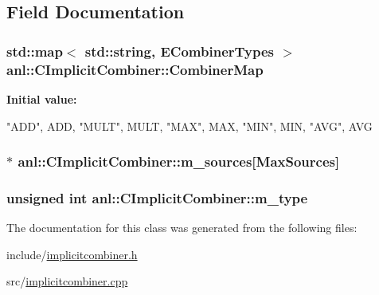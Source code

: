 \subsection{Field Documentation}
\hypertarget{classanl_1_1CImplicitCombiner_abedfc241ba96af092ef7b757a21b54c8}{
\subsubsection[{CombinerMap}]{\setlength{\rightskip}{0pt plus 5cm}std::map$<$ std::string, {\bf ECombinerTypes} $>$ {\bf anl::CImplicitCombiner::CombinerMap}}}
\label{classanl_1_1CImplicitCombiner_abedfc241ba96af092ef7b757a21b54c8}
{\bfseries Initial value:}
\begin{DoxyCode}
 {
                {"ADD", ADD},
                {"MULT", MULT},
                {"MAX", MAX},
                {"MIN", MIN},
                {"AVG", AVG}
        }
\end{DoxyCode}
\hypertarget{classanl_1_1CImplicitCombiner_a133d11b6df60ebfbdcdbac9f8e326b90}{
\subsubsection[{m\_\-sources}]{$\ast$ {\bf anl::CImplicitCombiner::m\_\-sources}\mbox{[}MaxSources\mbox{]}}}
\label{classanl_1_1CImplicitCombiner_a133d11b6df60ebfbdcdbac9f8e326b90}
\hypertarget{classanl_1_1CImplicitCombiner_afd67ca429853294cc7923d782a467d2a}{
\subsubsection[{m\_\-type}]{\setlength{\rightskip}{0pt plus 5cm}unsigned int {\bf anl::CImplicitCombiner::m\_\-type}}}
\label{classanl_1_1CImplicitCombiner_afd67ca429853294cc7923d782a467d2a}


The documentation for this class was generated from the following files:\begin{DoxyCompactItemize}
\item 
include/\hyperlink{implicitcombiner_8h}{implicitcombiner.h}\item 
src/\hyperlink{implicitcombiner_8cpp}{implicitcombiner.cpp}\end{DoxyCompactItemize}
